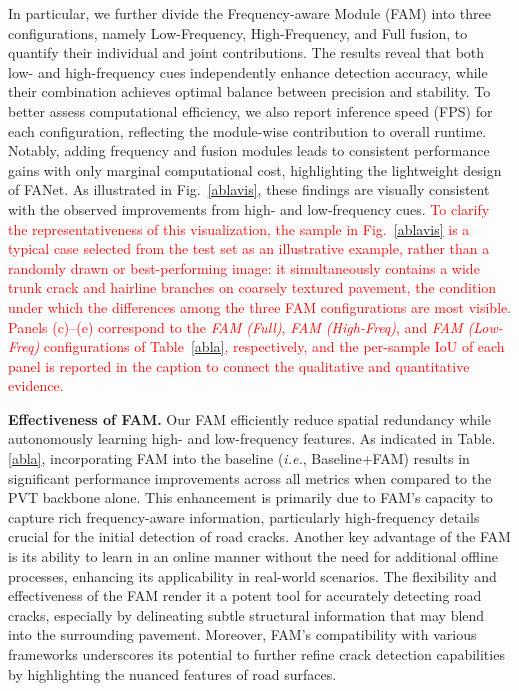 \documentclass[journal]{IEEEtran}
\begin{document}
In particular, we further divide the Frequency-aware Module (FAM) into three configurations, namely Low-Frequency, High-Frequency, and Full fusion, to quantify their individual and joint contributions.
The results reveal that both low- and high-frequency cues independently enhance detection accuracy, while their combination achieves optimal balance between precision and stability.
To better assess computational efficiency, we also report inference speed (FPS) for each configuration, reflecting the module-wise contribution to overall runtime.
Notably, adding frequency and fusion modules leads to consistent performance gains with only marginal computational cost, highlighting the lightweight design of FANet.
As illustrated in Fig.~\ref{ablavis}, these findings are visually consistent with the observed improvements from high- and low-frequency cues.
\textcolor{red}{To clarify the representativeness of this visualization, the sample in Fig.~\ref{ablavis} is a typical case selected from the test set as an illustrative example, rather than a randomly drawn or best-performing image: it simultaneously contains a wide trunk crack and hairline branches on coarsely textured pavement, the condition under which the differences among the three FAM configurations are most visible. Panels (c)--(e) correspond to the \emph{FAM (Full)}, \emph{FAM (High-Freq)}, and \emph{FAM (Low-Freq)} configurations of Table~\ref{abla}, respectively, and the per-sample IoU of each panel is reported in the caption to connect the qualitative and quantitative evidence.}


\textbf{Effectiveness of FAM.} Our FAM efficiently reduce spatial redundancy while autonomously learning high- and low-frequency features. As indicated in Table. \ref{abla}, incorporating FAM into the baseline (\textit{i.e.}, Baseline+FAM) results in significant performance improvements across all metrics when compared to the PVT backbone alone. This enhancement is primarily due to FAM's capacity to capture rich frequency-aware information, particularly high-frequency details crucial for the initial detection of road cracks. Another key advantage of the FAM is its ability to learn in an online manner without the need for additional offline processes, enhancing its applicability in real-world scenarios. The flexibility and effectiveness of the FAM render it a potent tool for accurately detecting road cracks, especially by delineating subtle structural information that may blend into the surrounding pavement. Moreover, FAM's compatibility with various frameworks underscores its potential to further refine crack detection capabilities by highlighting the nuanced features of road surfaces.
\end{document}
